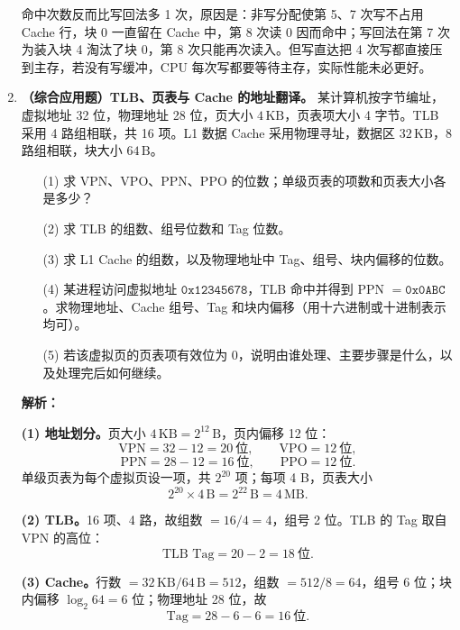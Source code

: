 \begin{enumerate}[leftmargin=*]
命中次数反而比写回法多 1 次，原因是：非写分配使第 5、7 次写不占用 Cache 行，块 0 一直留在 Cache 中，第 8 次读 0 因而命中；写回法在第 7 次为装入块 4 淘汰了块 0，第 8 次只能再次读入。但写直达把 4 次写都直接压到主存，若没有写缓冲，CPU 每次写都要等待主存，实际性能未必更好。\par\noindent{}\else \answerarea[12] \fi

\item \textbf{（综合应用题）TLB、页表与 Cache 的地址翻译。}
某计算机按字节编址，虚拟地址 32 位，物理地址 28 位，页大小 $4\,\mathrm{KB}$，页表项大小 4 字节。TLB 采用 4 路组相联，共 16 项。L1 数据 Cache 采用物理寻址，数据区 $32\,\mathrm{KB}$，8 路组相联，块大小 $64\,\mathrm{B}$。
\begin{enumerate}
    \item[(1)] 求 VPN、VPO、PPN、PPO 的位数；单级页表的项数和页表大小各是多少？
    \item[(2)] 求 TLB 的组数、组号位数和 Tag 位数。
    \item[(3)] 求 L1 Cache 的组数，以及物理地址中 Tag、组号、块内偏移的位数。
    \item[(4)] 某进程访问虚拟地址 $\mathtt{0x12345678}$，TLB 命中并得到 PPN $=\mathtt{0x0ABC}$。求物理地址、Cache 组号、Tag 和块内偏移（用十六进制或十进制表示均可）。
    \item[(5)] 若该虚拟页的页表项有效位为 0，说明由谁处理、主要步骤是什么，以及处理完后如何继续。
\end{enumerate}

\ifshowsolutions\par\noindent\textbf{解析：}

\textbf{(1) 地址划分。}页大小 $4\,\mathrm{KB}=2^{12}\,\mathrm{B}$，页内偏移 12 位：
\[
\text{VPN}=32-12=20\ \text{位},\qquad \text{VPO}=12\ \text{位},
\]
\[
\text{PPN}=28-12=16\ \text{位},\qquad \text{PPO}=12\ \text{位}.
\]
单级页表为每个虚拟页设一项，共 $2^{20}$ 项；每项 4 B，页表大小
\[
2^{20}\times 4\,\mathrm{B}=2^{22}\,\mathrm{B}=4\,\mathrm{MB}.
\]

\textbf{(2) TLB。}16 项、4 路，故组数 $=16/4=4$，组号 2 位。TLB 的 Tag 取自 VPN 的高位：
\[
\text{TLB Tag}=20-2=18\ \text{位}.
\]

\textbf{(3) Cache。}行数 $=32\,\mathrm{KB}/64\,\mathrm{B}=512$，组数 $=512/8=64$，组号 6 位；块内偏移 $\log_2 64=6$ 位；物理地址 28 位，故
\[
\text{Tag}=28-6-6=16\ \text{位}.
\]


\end{enumerate}
